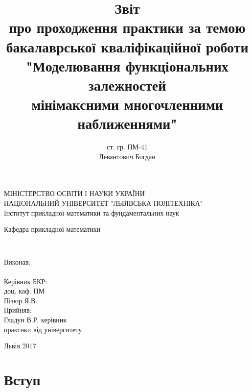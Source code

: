 \documentclass[ukrainian,14pt]{extarticle}
\begin{document}
\title{
	Звіт \\
	про проходження практики за темою \\
	бакалаврської кваліфікаційної роботи\\
    "Моделювання функціональних залежностей \\
	мінімаксними многочленними наближеннями"
}
\author{ст. гр. ПМ-41 \\  Левантович Богдан}

\makeatletter
\begin{titlepage}
        \centering
	МІНІСТЕРСТВО ОСВІТИ І НАУКИ УКРАЇНИ \\
	НАЦІОНАЛЬНИЙ УНІВЕРСИТЕТ "ЛЬВІВСЬКА ПОЛІТЕХНІКА" \\
	Інститут прикладної математики та фундаментальних наук\\
	\vspace{20pt}
	
	\begin{flushright}
	Кафедра прикладної математики
	\end{flushright}
	\vspace{30pt}
	\centering
	\vspace{\fill}

	\@title \\
	\vspace{100pt}
	\raggedright
        \setlength{\leftskip}{11cm}
	Виконав:\\
	\@author\\
        Керівник БКР:\\
        доц. каф. ПМ \\
        Пізюр Я.В.\\
	Прийняв: \\
	Гладун В.Р. керівник \\
	практики від університету\\
        \setlength{\leftskip}{0cm}
	\vspace{80pt}
	\centering


	Львів 2017
\end{titlepage}
\makeatother

\setcounter{page}{2}
\tableofcontents

\newpage


\section*{Вступ}

\end{document}

